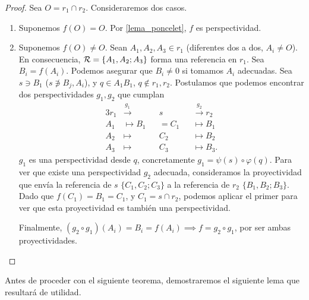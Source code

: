 \begin{proof} %
    Sea $O = r_1 \cap r_2$. Consideraremos dos casos.
    \begin{enumerate}
        \item Suponemos $f(O) = O$. Por \ref{lema_poncelet}, 
        $f$ es perspectividad.
        \item Suponemos $f(O) \neq O$. Sean $A_1, A_2, A_3 \in r_1$
        (diferentes dos a dos, $A_i \neq O$). En consecuencia,
        $\mathcal{R} = \{A_1, A_2; A_3\}$ forma una referencia en $r_1$.
        Sea $B_i = f(A_i)$. Podemos asegurar que $B_i \neq 0$
        si tomamos $A_i$ adecuadas. Sea $s \ni B_1$ ($ s 
        \not \ni B_j, A_i$), y $q \in A_1B_1$, $q \not
        \in r_1, r_2$. Postulamos que podemos encontrar
        dos perspectividades $g_1, g_2$ que cumplan
        \begin{alignat*}{3}
            r_1 &\stackrel{g_1}\longrightarrow &&s&&
            \stackrel{g_2}\longrightarrow r_2\\
            A_1 &\longmapsto B_1&&=C_1 &&\longmapsto B_1\\
            A_2 &\longmapsto &&C_2&&\longmapsto B_2\\
            A_3 &\longmapsto &&C_3&&\longmapsto B_3.
        \end{alignat*}
        $g_1$ es una perspectividad desde $q$, concretamente
        $g_1 = \psi(s) \circ \varphi(q)$. Para ver que existe
        una perspectividad $g_2$ adecuada, consideramos la
        proyectividad que envía la referencia de $s$
        $\{C_1, C_2; C_3\}$ a la referencia de $r_2$ $\{B_1,
        B_2; B_3\}$. Dado que $f(C_1) = B_1 = C_1$, y $C_1 = 
        s \cap r_2$, podemos aplicar el primer para ver que 
        esta proyectividad es también una perspectividad.
        
        Finalmente, $(g_2 \circ g_1)(A_i) = B_i = f(A_i) \implies
        f = g_2 \circ g_1$, por ser ambas proyectividades.
        
    \end{enumerate}
\end{proof}

Antes de proceder con el siguiente teorema, demostraremos
el siguiente lema que resultará de utilidad.

